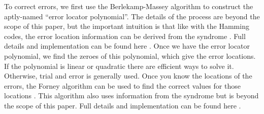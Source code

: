 \documentclass{article}
\begin{document}
To correct errors, we first use the Berlekamp-Massey algorithm to construct the aptly-named ``error locator polynomial''. The details of the process are beyond the scope of this paper, but the important intuition is that like with the Hamming codes, the error location information can be derived from the syndrome \cite{berlekamp, massey}. Full details and implementation can be found here \cite{wikiversity}. Once we have the error locator polynomial, we find the zeroes of this polynomial, which give the error locations. If the polynomial is linear or quadratic there are efficient ways to solve it. Otherwise, trial and error is generally used. Once you know the locations of the errors, the Forney algorithm can be used to find the correct values for those locations \cite{forney}. This algorithm also uses information from the syndrome but is beyond the scope of this paper. Full details and implementation can be found here \cite{wikiversity}.




\end{document}
